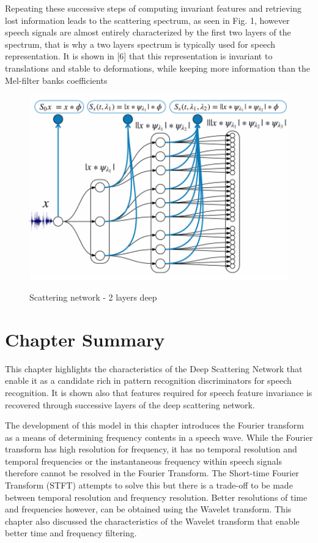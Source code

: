 Repeating these successive steps of computing invariant features and retrieving lost information leads to the scattering spectrum, as seen in Fig. 1, however speech signals are almost entirely characterized by the first two layers of the spectrum, that is why a two layers spectrum is typically used for speech representation. It is shown in [6] that this representation is invariant to translations and stable to deformations, while keeping more information than the Mel-filter banks coefficients
\begin{figure}
\centering
  \includegraphics[width=14cm]{thesis/images/scatter.png}\\
  \caption{Scattering network - 2 layers deep} \cite{zeghidour2016deep}\label{fig_4_3_scatter}
\end{figure}

\section{Chapter Summary}
This chapter highlights the characteristics of the Deep Scattering Network that enable it as a candidate rich in pattern recognition discriminators for speech recognition. It is shown also that features required for speech feature invariance is recovered through successive layers of the deep scattering network.  

The development of this model in this chapter introduces the Fourier transform as a means of determining frequency contents in a speech wave.  While the Fourier transform has high resolution for frequency, it has no temporal resolution and temporal frequencies or the instantaneous frequency within speech signals therefore cannot be resolved in the Fourier Transform.   The Short-time Fourier Transform (STFT) attempts to solve this but there is a trade-off to be made between temporal resolution and frequency resolution.  Better resolutions of time and frequencies however, can be obtained using the Wavelet transform.  This chapter also discussed the characteristics of the Wavelet transform that enable better time and frequency filtering.


